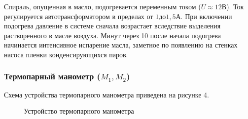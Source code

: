 Спираль, опущенная в масло, подогревается переменным током ($U \approx 12\text{В}$). Ток регулируется автотрансформатором в пределах от $1 до 1,5\text{А}$. При включении подогрева давление в системе сначала возрастает вследствие выделения растворенного в масле воздуха. Минут через 10 после начала подогрева начинается интенсивное испарение масла, заметное по появлению на стенках насоса пленки конденсирующихся паров.

\subsubsection{Термопарный манометр ($M_1, M_2$)}
Схема устройства термопарного манометра приведена на рисунке 4.
\begin{figure}[ht]
    \label{figure4}
    \caption{Устройство термопарного манометра}
\end{figure}

